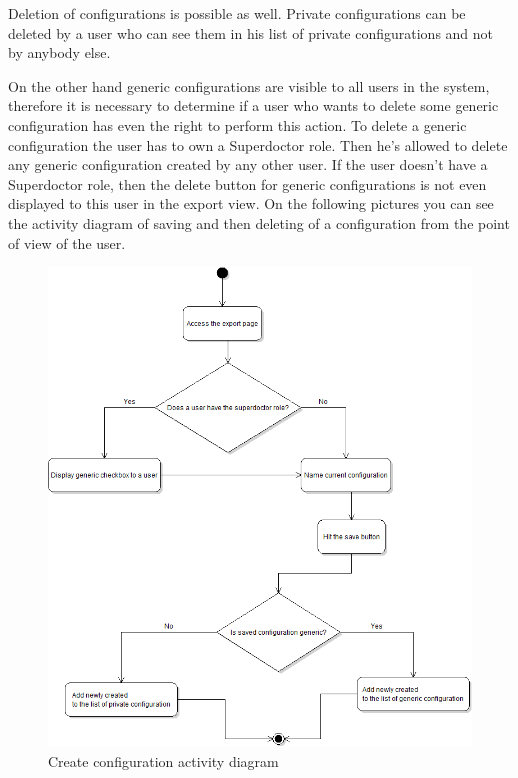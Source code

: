 \documentclass[thesis=B,english]{FITthesis}[2012/10/20]
\begin{document}
Deletion of configurations is possible as well. Private configurations can be deleted by a user who can see them in his list of private configurations and not by anybody else. 

On the other hand generic configurations are visible to all users in the system, therefore it is necessary to determine if a user who wants to delete some generic configuration has even the right to perform this action. To delete a generic configuration the user has to own a Superdoctor role. Then he's allowed to delete any generic configuration created by any other user. If the user doesn't have a Superdoctor role, then the delete button for generic configurations is not even displayed to this user in the export view.
On the following pictures you can see the activity diagram of saving and then deleting of a configuration from the point of view of the user.

\begin{figure}
	\centering
 	\includegraphics[width=1\textwidth]{images/createConfigurationDiagram.png}
 	\caption{Create configuration activity diagram}
 	\label{fig:createConfigurationDiagram}
\end{figure}
\end{document}

